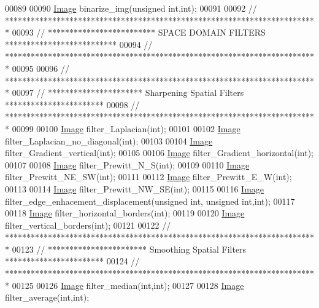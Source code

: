 \begin{DoxyCode}
00089 
00090     \hyperlink{class_image}{Image} binarize\_img(\textcolor{keywordtype}{unsigned} \textcolor{keywordtype}{int},\textcolor{keywordtype}{int}); 
00091         
00092 \textcolor{comment}{// *************************************************************************}
00093 \textcolor{comment}{// ************************* SPACE DOMAIN FILTERS **************************}
00094 \textcolor{comment}{// *************************************************************************}
00095 
00096 \textcolor{comment}{// *************************************************************************}
00097 \textcolor{comment}{// ********************** Sharpening Spatial Filters ***********************}
00098 \textcolor{comment}{// *************************************************************************}
00099 
00100     \hyperlink{class_image}{Image} filter\_Laplacian(\textcolor{keywordtype}{int}); 
00101     
00102     \hyperlink{class_image}{Image} filter\_Laplacian\_no\_diagonal(\textcolor{keywordtype}{int}); 
00103 
00104     \hyperlink{class_image}{Image} filter\_Gradient\_vertical(\textcolor{keywordtype}{int}); 
00105     
00106     \hyperlink{class_image}{Image} filter\_Gradient\_horizontal(\textcolor{keywordtype}{int}); 
00107     
00108     \hyperlink{class_image}{Image} filter\_Prewitt\_N\_S(\textcolor{keywordtype}{int}); 
00109     
00110     \hyperlink{class_image}{Image} filter\_Prewitt\_NE\_SW(\textcolor{keywordtype}{int}); 
00111     
00112     \hyperlink{class_image}{Image} filter\_Prewitt\_E\_W(\textcolor{keywordtype}{int}); 
00113     
00114     \hyperlink{class_image}{Image} filter\_Prewitt\_NW\_SE(\textcolor{keywordtype}{int}); 
00115 
00116     \hyperlink{class_image}{Image} filter\_edge\_enhacement\_displacement(\textcolor{keywordtype}{unsigned} \textcolor{keywordtype}{int}, \textcolor{keywordtype}{unsigned} \textcolor{keywordtype}{int},\textcolor{keywordtype}{int}); 
00117     
00118     \hyperlink{class_image}{Image} filter\_horizontal\_borders(\textcolor{keywordtype}{int});
00119     
00120     \hyperlink{class_image}{Image} filter\_vertical\_borders(\textcolor{keywordtype}{int});
00121     
00122 \textcolor{comment}{// *************************************************************************}
00123 \textcolor{comment}{// *********************** Smoothing Spatial Filters ***********************}
00124 \textcolor{comment}{// *************************************************************************}
00125 
00126     \hyperlink{class_image}{Image} filter\_median(\textcolor{keywordtype}{int},\textcolor{keywordtype}{int}); 
00127     
00128     \hyperlink{class_image}{Image} filter\_average(\textcolor{keywordtype}{int},\textcolor{keywordtype}{int}); 

\end{DoxyCode}
